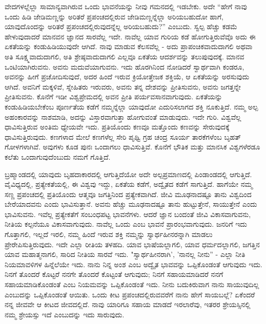 ವೇದಗಳಲ್ಲೆಲ್ಲಾ ಸಾಮಾನ್ಯವಾಗಿರುವ ಒಂದು ಭಾವನೆಯನ್ನು ನೀವು ಗಮನದಲ್ಲಿ ಇಡಬೇಕು. ಅದೇ “ಹೇಗೆ ನಾವು ಒಂದು ಹಿಡಿ ಜೇಡಿಮಣ್ಣನ್ನು ಅರಿತರೆ ಪ್ರಪಂಚದಲ್ಲಿರುವ ಜೇಡಿಮಣ್ಣನ್ನೆಲ್ಲಾ ಅರಿಯಬಹುದೋ ಹಾಗೆ, ಯಾವುದೊಂದನ್ನು ಅರಿತರೆ ಪ್ರಪಂಚದಲ್ಲಿರುವುದನ್ನೆಲ್ಲ ಅರಿಯಬಹುದು?” ಎಂಬುದು. ಸ್ವಲ್ಪ ಹೆಚ್ಚು ಕಡಮೆ ಹೇಳುವುದಾದರೆ ಮಾನವನ ಜ್ಞಾನದ ಸಾರವೆಲ್ಲ ಇದೇ. ನಾವೆಲ್ಲ ಯಾವ ಗುರಿಯ ಕಡೆ ಹೋಗುತ್ತಿರುವೆವೊ ಅದು ಈ ಏಕತೆಯನ್ನು ಕಂಡುಹಿಡಿಯುವುದೇ ಆಗಿದೆ. ನಾವು ಮಾಡುವ ಕೆಲಸವೆಲ್ಲ - ಅದು ಪ್ರಾಪಂಚಿಕವಾದುದಾಗಲಿ ಅಥವಾ ಅತಿ ಸೂಕ್ಷ್ಮವಾದುದಾಗಲಿ, ಅತಿ ಶ್ರೇಷ್ಠವಾದುದಾಗಲಿ ಎಲ್ಲವೂ ಏಕತೆಯ ಆದರ್ಶವನ್ನು ತಲುಪುವುದಕ್ಕೆ. ಮಾನವ ಒಂಟಿಯಾಗಿರುವನು. ಅವನು ಮದುವೆಯಾಗುವನು. ಇದು ಹೊರಗಿನಿಂದ ನೋಡಿದರೆ ಸ್ವಾರ್ಥವಾಗಿ ಕಂಡರೂ, ಅವನನ್ನು ಹೀಗೆ ಪ್ರಚೋದಿಸುವುದೆ, ಅದರ ಹಿಂದೆ ಇರುವ ಕ್ರಿಯೋತ್ತೇಜಕ ಶಕ್ತಿಯೆ, ಆ ಏಕತೆಯನ್ನು ಅರಸುವುದು ಆಗಿದೆ. ಅವನಿಗೆ ಮಕ್ಕಳಿವೆ, ಸ್ನೇಹಿತರು ಇರುವರು, ಅವನು ತನ್ನ ದೇಶವನ್ನು ಪ್ರೀತಿಸುವನು, ಅವನು ಜಗತ್ತನ್ನೇ ಪ್ರೀತಿಸುವನು. ಕೊನೆಗೆ ಇಡೀ ವಿಶ್ವಪ್ರೇಮದಲ್ಲಿ ಅವನ ಪ್ರೀತಿ ಪರ್ಯವಸಾನವಾಗುವುದು. ಏಕತೆಯನ್ನು ಕಂಡುಹಿಡಿಯಬೇಕೆಂಬ ಪೂರ್ಣತೆಯ ಕಡೆಗೆ ನಮ್ಮನ್ನೆಲ್ಲಾ ಯಾವುದೋ ಎದುರಿಸಲಾಗದ ಶಕ್ತಿ ನೂಕುತ್ತಿದೆ. ನಮ್ಮ ಅಲ್ಪ ಅಹಂಕಾರವನ್ನು ನಾಶಮಾಡಿ, ಅದನ್ನು ವಿಸ್ತಾರವಾಗುತ್ತಾ ಹೋಗುವಂತೆ ಮಾಡುವುದು. ಇದೇ ಗುರಿ. ವಿಶ್ವವೆಲ್ಲ ಧಾವಿಸುತ್ತಿರುವ ಅಂತಿಮ ಧ್ಯೇಯವೇ ಇದು. ಪ್ರತಿಯೊಂದು ಕಣವೂ ಮತ್ತೊಂದು ಕಣವನ್ನು ಸೇರುವುದಕ್ಕೆ ಧಾವಿಸುತ್ತಿರುವುದು. ಕಣಗಳಾದ ಮೇಲೆ ಕಣಗಳೆಲ್ಲ ಸೇರಿ ಪೃಥ್ವಿ ಗ್ರಹ ಚಂದ್ರ ಸೂರ್ಯ ತಾರಕೆಗಳೆಂಬ ಬೃಹತ್ ಗೋಳಗಳಾಗಿವೆ. ಅವುಗಳು ಕೂಡ ಪುನಃ ಒಂದಾಗಲು ಧಾವಿಸುತ್ತಿವೆ. ಕೊನೆಗೆ ಭೌತಿಕ ಮತ್ತು ಮಾನಸಿಕ ವಿಶ್ವಗಳೆರಡೂ ಕಲೆತು ಒಂದಾಗುವುದೆಂಬುದು ನಮಗೆ ಗೊತ್ತಿದೆ.

ಬ್ರಹ್ಮಾಂಡದಲ್ಲಿ ಯಾವುದು ಬೃಹದಾಕಾರದಲ್ಲಿ ಆಗುತ್ತಿದೆಯೋ ಅದೇ ಅಲ್ಪಪ್ರಮಾಣದಲ್ಲಿ ಪಿಂಡಾಂಡದಲ್ಲಿ ಆಗುತ್ತಿದೆ. ವೈವಿಧ್ಯದಲ್ಲಿ, ಪ್ರತ್ಯೇಕತೆಯಲ್ಲಿ, ಈ ವಿಶ್ವವು ಇದ್ದು, ಏಕತೆಯ ಕಡೆಗೆ, ಅದ್ವೈತದ ಕಡೆಗೆ ಸಾಗುತ್ತಿದೆ. ಹಾಗೆಯೇ ನಮ್ಮ ಸಣ್ಣ ಪ್ರಪಂಚದಲ್ಲಿ ಪ್ರತಿಯೊಂದು ಆತ್ಮವೂ ಜಗತ್ತಿನಿಂದ ಪ್ರತ್ಯೇಕವಾಗಿದೆ. ಜೀವಿ ಮೂಢನಾದಷ್ಟೂ ತಾನು ವಿಶ್ವದಿಂದ ಬೇರೆಯಾದವನು ಎಂದು ಭಾವಿಸುತ್ತಾನೆ. ಅವನು ಹೆಚ್ಚು ಮೂಢನಾದಷ್ಟೂ ತಾನು ಹುಟ್ಟುತ್ತೇನೆ, ಸಾಯುತ್ತೇನೆ ಎಂದು ಭಾವಿಸುವನು. ಇವೆಲ್ಲ ಪ್ರತ್ಯೇಕತೆಗೆ ಸಂಬಂಧಪಟ್ಟ ಭಾವನೆಗಳು. ಆದರೆ ಜ್ಞಾನ ಬಂದಂತೆ ಜೀವಿ ವಿಕಾಸವಾಗುವನು, ನೀತಿಯ ಕಲ್ಪನೆಯೂ ವಿಕಾಸವಾಗುವುದು. ನಾವೆಲ್ಲ ಒಂದು ಎಂಬ ಭಾವನೆ ಪ್ರಾರಂಭವಾಗುವುದು. ಜನರಿಗೆ ಇದು ಗೊತ್ತಾಗಲಿ, ಇಲ್ಲದೆ ಇರಲಿ, ನಮ್ಮ ಹಿಂದೆ ಇರುವ ಶಕ್ತಿ ನಮ್ಮನ್ನು ಸ್ವಾರ್ಥಹೀನರನ್ನಾಗಿ ಮಾಡಲು ಪ್ರೇರೇಪಿಸುತ್ತಿರುವುದು. ಇದೇ ಎಲ್ಲಾ ರೀತಿಯ ತಳಹದಿ. ಯಾವ ಭಾಷೆಯಲ್ಲಾಗಲಿ, ಯಾವ ಧರ್ಮದಲ್ಲಾಗಲಿ, ಜಗತ್ತಿನ ಯಾವ ಮಹಾತ್ಮನಾಗಲಿ, ಸಾರಿದ ನೀತಿಯ ಸಾರವೆ ಇದು. "ಸ್ವಾರ್ಥಹೀನರಾಗಿ', 'ನಾನಲ್ಲ ನೀನು'' - ಎಲ್ಲಾ ನೀತಿ ನಿಯಮಾವಳಿಗಳ ಹಿನ್ನೆಲೆಯೇ ಇದು. ನಾನು ನಿನ್ನ ಅಂಶ ಎಂಬ ಅದ್ವೈತ ಭಾವವನ್ನು ಒಪ್ಪಿಕೊಂಡಂತೆ ಆಗುವುದು ಇದು. ನಿನಗೆ ತೊಂದರೆ ಕೊಟ್ಟರೆ ನನಗೇ ತೊಂದರೆ ಕೊಟ್ಟಂತೆ ಆಗುವುದು; ನಿನಗೆ ಸಹಾಯಮಾಡಿದರೆ ನನಗೆ ಸಹಾಯಮಾಡಿಕೊಂಡಂತೆ ಎಂಬ ನಿಯಮವನ್ನು ಒಪ್ಪಿಕೊಂಡಂತೆ ಇದು. ನೀನು ಬದುಕಿರುವಾಗ ನಾನು ಸಾಯುವುದಿಲ್ಲ ಎಂಬುದನ್ನು ಒಪ್ಪಿಕೊಂಡಂತೆ ಆಯಿತು. ಒಂದು ಕೀಟ ಪ್ರಪಂಚದಲ್ಲಿರುವವರೆಗೆ ನಾನು ಹೇಗೆ ಸಾಯಬಲ್ಲೆ? ಏಕೆಂದರೆ ನನ್ನ ಜೀವವೇ ಆ ಕೀಟದ ಜೀವದಲ್ಲಿದೆ. ನಾವು ಯಾರಿಗೂ ಸಹಾಯ ಮಾಡದೆ ಇರಲಾರೆವು, ಇತರರ ಶ್ರೇಯಸ್ಸಿನಲ್ಲಿ ನಮ್ಮ ಶ್ರೇಯಸ್ಸು ಇದೆ ಎಂಬುದನ್ನು ಇದು ಸಾರುವುದು.

